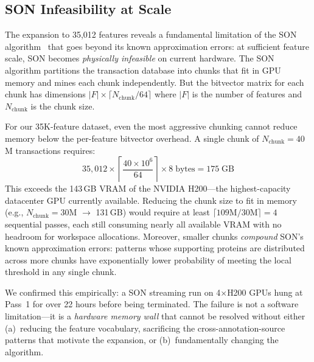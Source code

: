 %

\subsection{SON Infeasibility at Scale}
\label{sec:son-infeasible}

The expansion to 35,012 features reveals a fundamental limitation of the SON
algorithm~\cite{savasere1995} that goes beyond its known approximation
errors: at sufficient feature scale, SON becomes \emph{physically infeasible}
on current hardware. The SON algorithm partitions the transaction database into
chunks that fit in GPU memory and mines each chunk independently. But the
bitvector matrix for each chunk has dimensions
$|F| \times \lceil N_{\text{chunk}} / 64 \rceil$ where $|F|$ is the number
of features and $N_{\text{chunk}}$ is the chunk size.

For our 35K-feature dataset, even the most aggressive chunking cannot reduce
memory below the per-feature bitvector overhead. A single chunk of
$N_{\text{chunk}} = 40$M transactions requires:
%
\begin{equation}
    35{,}012 \times \left\lceil \frac{40 \times 10^6}{64} \right\rceil
    \times 8 \;\text{bytes} = 175\;\text{GB}
    \label{eq:son-oom}
\end{equation}
%
This exceeds the 143\,GB VRAM of the NVIDIA H200---the highest-capacity
datacenter GPU currently available. Reducing the chunk size to fit in memory
(e.g., $N_{\text{chunk}} = 30$M $\rightarrow$ 131\,GB) would require at
least $\lceil 109\text{M} / 30\text{M} \rceil = 4$ sequential passes, each
still consuming nearly all available VRAM with no headroom for workspace
allocations. Moreover, smaller chunks \emph{compound} SON's known
approximation errors: patterns whose supporting proteins are distributed
across more chunks have exponentially lower probability of meeting the local
threshold in any single chunk.

We confirmed this empirically: a SON streaming run on 4$\times$H200 GPUs
hung at Pass~1 for over 22 hours before being terminated. The failure is not
a software limitation---it is a \emph{hardware memory wall} that cannot be
resolved without either (a)~reducing the feature vocabulary, sacrificing the
cross-annotation-source patterns that motivate the expansion, or
(b)~fundamentally changing the algorithm.

